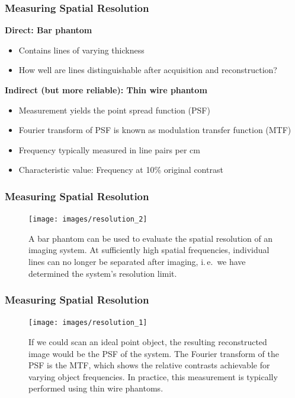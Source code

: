 \begin{frame}
	\frametitle{Measuring Spatial Resolution}

	\textcolor{faublue}{\textbf{Direct: Bar phantom}}
	\vspace{0.3cm}
	\begin{itemize}
		\setlength\itemsep{0.2cm}
		\item Contains lines of varying thickness
		\item How well are lines distinguishable after acquisition and reconstruction?
	\end{itemize}

	\vspace{0.5cm}
	\textcolor{faublue}{\textbf{Indirect (but more reliable): Thin wire phantom}}
	\vspace{0.3cm}
	\begin{itemize}
		\setlength\itemsep{0.2cm}
		\item Measurement yields the point spread function (PSF)
		\item Fourier transform of PSF is known as modulation transfer function (MTF)
		\item Frequency typically measured in line pairs per cm
		\item Characteristic value: Frequency at 10\% original contrast
	\end{itemize}

\end{frame}

\begin{frame}
	\frametitle{Measuring Spatial Resolution}

	\begin{figure}
		\begin{center}
			\texttt{[image: images/resolution\_2]}
		\end{center}
		\caption{A bar phantom can be used to evaluate the spatial resolution of an imaging system. At sufficiently high spatial frequencies, individual lines can no longer be separated after imaging, i.\,e.~we have determined the system's resolution limit.}
		\label{fig:ct_resolution_2}
	\end{figure}

\end{frame}



\begin{frame}
	\frametitle{Measuring Spatial Resolution}

	\begin{figure}
		\begin{center}
			\texttt{[image: images/resolution\_1]}
		\end{center}
		\caption{If we could scan an ideal point object, the resulting reconstructed image would be the PSF of the system. The Fourier transform of the PSF is the MTF, which shows the relative contrasts achievable for varying object frequencies. In practice, this measurement is typically  performed using thin wire phantoms.}
		\label{fig:ct_resolution_1}
	\end{figure}

\end{frame}

